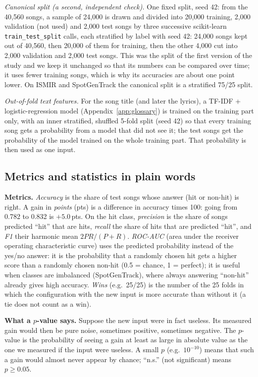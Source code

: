 \documentclass[conference]{IEEEtran}
\newcommand{\pp}{\,pts}
\begin{document}
\emph{Canonical split (a second, independent check).} One fixed split, seed 42: from the 40{,}560 songs, a
sample of 24{,}000 is drawn and divided into 20{,}000 training, 2{,}000 validation (not used) and
2{,}000 test songs by three successive scikit-learn \texttt{train\_test\_split} calls, each stratified by label with
seed 42: 24{,}000 songs kept out of 40{,}560, then 20{,}000 of them for training, then the other 4{,}000 cut into
2{,}000 validation and 2{,}000 test songs. This was the split of the first version of the study and we keep it unchanged so that its
numbers can be compared over time; it uses fewer training songs, which is why its accuracies are about one point
lower. On ISMIR and SpotGenTrack the canonical split is a stratified 75/25 split.

\emph{Out-of-fold text features.} For the song title (and later the lyrics), a TF-IDF + logistic-regression model
(Appendix~\ref{app:glossary}) is trained on the training part only, with an inner stratified, shuffled 5-fold split (seed 42) so that every training song
gets a probability from a model that did not see it; the test songs get the probability of the model trained on the
whole training part. That probability is then used as one input.

\subsection{Metrics and statistics in plain words}\label{sec:stats}
\textbf{Metrics.} \emph{Accuracy} is the share of test songs whose answer (hit or non-hit) is right. A gain in
\emph{points} (pts) is a difference in accuracy times 100: going from 0.782 to 0.832 is $+5.0$\pp. On the hit
class, \emph{precision} is the share of songs predicted ``hit'' that are hits, \emph{recall} the share of hits that
are predicted ``hit'', and \emph{F1} their harmonic mean $2PR/(P+R)$. \emph{ROC-AUC} (area under the receiver operating characteristic curve) uses the predicted probability
instead of the yes/no answer: it is the probability that a randomly chosen hit gets a higher score than a randomly
chosen non-hit (0.5 = chance, 1 = perfect); it is useful when classes are imbalanced (SpotGenTrack), where always
answering ``non-hit'' already gives high accuracy. \emph{Wins} (e.g.\ 25/25) is the number of the 25 folds in which
the configuration with the new input is more accurate than without it (a tie does not count as a win).

\textbf{What a $p$-value says.} Suppose the new input were in fact useless. Its measured gain would then be
pure noise, sometimes positive, sometimes negative. The $p$-value is the probability of seeing a gain at least as
large in absolute value as the one we measured if the input were useless. A small $p$ (e.g.\ $10^{-10}$) means
that such a gain would almost never appear by chance; ``n.s.'' (not significant) means $p\geq0.05$.
\end{document}
